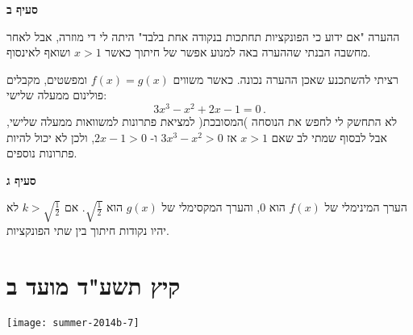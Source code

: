 \textbf{סעיף ב}

\vspace{-2ex}

\begin{center}
\end{center}

\vspace{-2ex}

ההערה "אם ידוע כי הפונקציות תחתכות בנקודה אחת בלבד" היתה לי די מוזרה, אבל לאחר מחשבה הבנתי שההערה באה למנוע אפשר של חיתוך כאשר
$x>1$
ושואף לאינסוף.

רציתי להשתכנע שאכן ההערה נכונה. כאשר משווים 
$f(x)=g(x)$
ומפשטים, מקבלים פולינום ממעלה שלישי:
\[
3x^3-x^2+2x-1=0\,.
\]
לא התחשק לי לחפש את הנוסחה )המסובכת( למציאת פתרונות למשוואות ממעלה שלישי, אבל לבסוף שמתי לב שאם
$x>1$
אז
$3x^3-x^2>0$
ו-%
$2x-1>0$,
ולכן לא יכול להיות פתרונות נוספים.

\textbf{סעיף ג}

הערך המינימלי של 
$f(x)$
הוא
$0$,
והערך המקסימלי של
$g(x)$
הוא
$\sqrt{\frac{1}{2}}$.
אם
$k>\sqrt{\frac{1}{2}}$
לא יהיו נקודות חיתוך בין שתי הפונקציות.

\np


\section{קיץ תשע"ד מועד ב}

\begin{center}
\texttt{[image: summer-2014b-7]}
\end{center}

